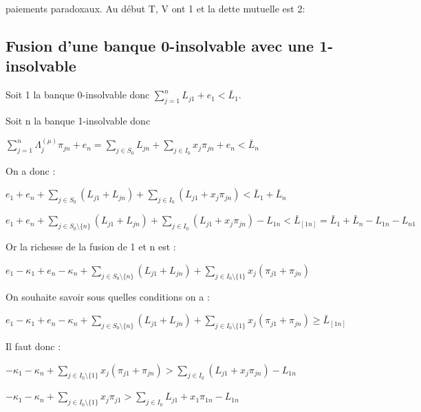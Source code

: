 \documentclass[11pt,oneside,twocolumn]{article}
\begin{document}
paiements paradoxaux. Au début T, V ont 1 et la dette mutuelle est 2:


\subsection{Fusion d'une banque 0-insolvable avec une 1-insolvable}

Soit 1 la banque 0-insolvable donc 
$\sum_{j=1}^{n} L_{j1} + e_{1} < \bar L_{1}$.

Soit n la banque 1-insolvable donc 

$\sum_{j=1}^{n} \Lambda^{(\mu)}_{j} \pi_{jn} + e_{n} = \sum_{j \in S_{0}} L_{jn} + \sum_{j \in I_{0}} x_{j} \pi_{jn} + e_{n} < \bar L_{n}$

On a donc :

$e_{1} + e_{n} + \sum_{j \in S_{0}} (L_{j1} + L_{jn}) + \sum_{j \in I_{0}} (L_{j1} + x_{j} \pi_{jn})  < \bar L_{1} +\bar L_{n}$ 

$e_{1} + e_{n} + \sum_{j \in S_{0}\setminus \lbrace n \rbrace} (L_{j1} + L_{jn}) + \sum_{j \in I_{0}} (L_{j1} + x_{j} \pi_{jn}) - L_{1n} < \bar L_{\left[1n \right]} = \bar L_{1} +\bar L_{n} - L_{1n} - L_{n1}$

Or la richesse de la fusion de 1 et n est : 

$e_{1} - \kappa_{1} + e_{n} - \kappa_{n} + \sum_{j \in S_{0}\setminus \lbrace n \rbrace} (L_{j1} + L_{jn}) + \sum_{j \in I_{0}\setminus \lbrace 1 \rbrace} x_{j}(\pi_{j1} + \pi_{jn})$

On souhaite savoir sous quelles conditions on a :

$e_{1} - \kappa_{1} + e_{n} - \kappa_{n} + \sum_{j \in S_{0}\setminus \lbrace n \rbrace} (L_{j1} + L_{jn}) + \sum_{j \in I_{0}\setminus \lbrace 1 \rbrace} x_{j}(\pi_{j1} + \pi_{jn}) \geq \bar L_{\left[1n \right]}$
 
Il faut donc : 

$- \kappa_{1} - \kappa_{n} + \sum_{j \in I_{0}\setminus \lbrace 1 \rbrace} x_{j}(\pi_{j1} + \pi_{jn}) > \sum_{j \in I_{0}} (L_{j1} + x_{j} \pi_{jn}) - L_{1n}$

$- \kappa_{1} - \kappa_{n} + \sum_{j \in I_{0}\setminus \lbrace 1 \rbrace} x_{j} \pi_{j1} > \sum_{j \in I_{0}} L_{j1} + x_{1} \pi_{1n} - L_{1n}$
\end{document}
